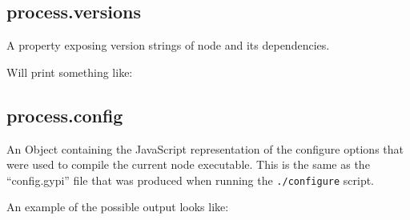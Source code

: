\subsection{process.versions}

A property exposing version strings of node and its dependencies.

\begin{Shaded}
\begin{Highlighting}[]
\NormalTok{(}\NormalTok{);}
\end{Highlighting}
\end{Shaded}

Will print something like:

\begin{Shaded}
\begin{Highlighting}[]
\NormalTok{\{ }\NormalTok{: }\NormalTok{,}
  \NormalTok{: }\NormalTok{,}
  \NormalTok{: }\NormalTok{,}
  \NormalTok{: }\NormalTok{,}
  \NormalTok{: }\NormalTok{,}
  \NormalTok{: }\NormalTok{,}
  \NormalTok{: }\NormalTok{,}
  \NormalTok{: } \NormalTok{\}}
\end{Highlighting}
\end{Shaded}

\subsection{process.config}

An Object containing the JavaScript representation of the configure
options that were used to compile the current node executable. This is
the same as the ``config.gypi'' file that was produced when running the
\texttt{./configure} script.

An example of the possible output looks like:

